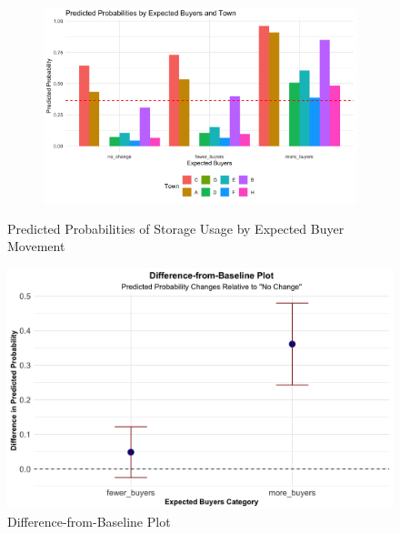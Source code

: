 \documentclass[12pt]{article}
\begin{document}
\begin{figure}[htbp]
    \begin{subfigure}{\textwidth}
        \centering
        \includegraphics[height=0.28\textheight]{figures/predicted_probs_by_town.png}
        \caption{}
    \end{subfigure}


    \caption{Predicted Probabilities of Storage Usage by Expected Buyer Movement}
    \label{fig:three-images}
\end{figure}





\begin{figure}[ht]
    \centering
    \includegraphics[width=1\textwidth]{figures/filtered_difference_from_baseline_plot.png}
    \caption{Difference-from-Baseline Plot}
    \label{Figure: Difference-from-Baseline Plot}
\end{figure}
\end{document}
